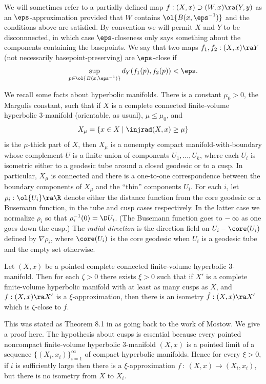 We will sometimes refer
to a partially defined map $f:(X,x)\supset (W,x)\ra (Y,y)$ as an
$\eps$-approximation provided that $W$ contains $\ol{B(x,\eps^{-1})}$ and
the conditions above are satisfied. By convention we will permit $X$ and $Y$
to be disconnnected, in which case $\eps$-closeness only says something about the
components containing the basepoints.
We say that two maps $f_1,f_2:(X,x)\ra Y$ (not necessarily basepoint-preserving)
are $\eps$-close if
\begin{equation}
\sup_{p\in \ol{B(x,\eps^{-1})}}d_Y(f_1(p),f_2(p))<\eps.
\end{equation}

We  recall some facts about hyperbolic manifolds.
There is a constant $\mu_0>0$, the Margulis constant,
such that if $X$ is a complete connected finite-volume
hyperbolic $3$-manifold (orientable, as usual), $\mu\leq \mu_0$, and
\begin{equation}
X_\mu=\{x\in X\mid \injrad(X,x)\geq \mu\}
\end{equation}
is the $\mu$-thick part of $X$, then $X_\mu$ is a nonempty
compact manifold-with-boundary whose complement $U$
is a finite union of components $U_1,\ldots,U_k$,
where each $U_i$ is isometric either to a geodesic tube
around a closed geodesic or to  a cusp.
In particular, $X_\mu$ is connected and there is a one-to-one
correspondence between the boundary components of $X_\mu$
and the ``thin'' components $U_i$.   For each $i$,
let $\rho_i:\ol{U_i}\ra\R$ denote either the distance function
from the core geodesic or a Busemann function, in the
tube and cusp cases respectively. In the latter case
we normalize $\rho_i$ so that $\rho_i^{-1}(0)=\D U_i$.  (The
Busemann function goes to $- \: \infty$ as one goes down
the cusp.)
The {\em radial direction}
is the direction field on $U_i -  \core(U_i)$
defined by $\nabla\rho_i$, where $\core(U_i)$ is the core
geodesic when $U_i$ is a geodesic tube and the empty set otherwise.

\begin{lemma}
  \label{lem:kl-hyperbolic-rigidity-stabilization-thick-part-existence-thick-thin-geometry}

\label{prasad}
Let $(X,x)$ be a pointed complete connected finite-volume hyperbolic
$3$-manifold.  Then for each $\zeta>0$ there exists $\xi>0$
such that if $X'$ is a complete finite-volume hyperbolic
manifold with at least as many cusps as $X$,
and $f:(X,x)\ra X'$ is a $\xi$-approximation, then there is an
isometry $\hat f: (X,x)\ra X'$ which
is $\zeta$-close to $f$.
\end{lemma}
This was stated as Theorem 8.1 in \cite{Hamiltonn} as going
back to the work of Mostow. We give a proof here.
The hypothesis about cusps is essential because every pointed noncompact
finite-volume hyperbolic $3$-manifold $(X,x)$ is a pointed limit of a sequence
$\{(X_i,x_i)\}_{i=1}^\infty$
of compact hyperbolic manifolds.
Hence for every $\xi > 0$, if $i$ is sufficiently large then there is a
$\xi$-approximation $f \: : \: (X, x) \rightarrow (X_i, x_i)$, but there is
no isometry from $X$ to $X_i$.

